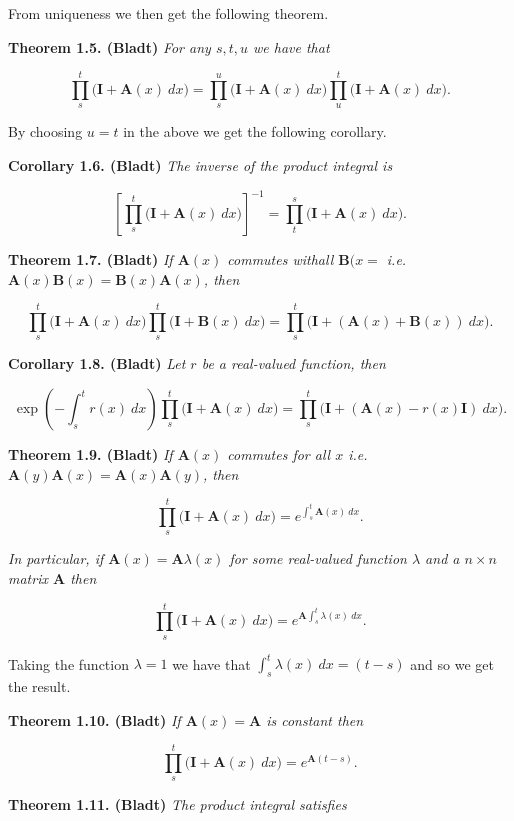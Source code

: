 \documentclass[a4paper,12pt,openany]{book}
\begin{document}
From uniqueness we then get the following theorem.

\textbf{Theorem 1.5. (Bladt)} \emph{For any \(s,t,u\) we have that}

\[
\prod_{s}^t\big(\mathbf{I}+\mathbf{A}(x)\ dx\big)=\prod_{s}^u\big(\mathbf{I}+\mathbf{A}(x)\ dx\big)\prod_{u}^t\big(\mathbf{I}+\mathbf{A}(x)\ dx\big).
\]

By choosing \(u=t\) in the above we get the following corollary.

\textbf{Corollary 1.6. (Bladt)} \emph{The inverse of the product integral is}

\[
\left[\prod_{s}^t\big(\mathbf{I}+\mathbf{A}(x)\ dx\big)\right]^{-1}=\prod_{t}^s\big(\mathbf{I}+\mathbf{A}(x)\ dx\big).
\]

\textbf{Theorem 1.7. (Bladt)} \emph{If \(\mathbf{A}(x)\) commutes withall \(\mathbf{B}(x=\) i.e.~\(\mathbf{A}(x)\mathbf{B}(x)=\mathbf{B}(x)\mathbf{A}(x)\), then}

\[
\prod_{s}^t\big(\mathbf{I}+\mathbf{A}(x)\ dx\big)\prod_{s}^t\big(\mathbf{I}+\mathbf{B}(x)\ dx\big)=\prod_{s}^t\big(\mathbf{I}+\left(\mathbf{A}(x)+\mathbf{B}(x)\right)\ dx\big).
\]

\textbf{Corollary 1.8. (Bladt)} \emph{Let \(r\) be a real-valued function, then}

\[
\exp\left(-\int_s^t r(x)\ dx\right)\prod_{s}^t\big(\mathbf{I}+\mathbf{A}(x)\ dx\big)=\prod_{s}^t\big(\mathbf{I}+\left(\mathbf{A}(x)-r(x)\mathbf{I}\right)\ dx\big).
\]

\textbf{Theorem 1.9. (Bladt)} \emph{If \(\mathbf{A}(x)\) commutes for all \(x\) i.e.~\(\mathbf{A}(y)\mathbf{A}(x)=\mathbf{A}(x)\mathbf{A}(y)\), then}

\[
\prod_{s}^t\big(\mathbf{I}+\mathbf{A}(x)\ dx\big)=e^{\int_s^t\mathbf{A}(x)\ dx}.
\]

\emph{In particular, if \(\mathbf{A}(x)=\mathbf{A}\lambda(x)\) for some real-valued function \(\lambda\) and a \(n\times n\) matrix \(\mathbf{A}\) then}

\[
\prod_{s}^t\big(\mathbf{I}+\mathbf{A}(x)\ dx\big)=e^{\mathbf{A}\int_s^t\lambda(x)\ dx}.
\]

Taking the function \(\lambda=1\) we have that \(\int_s^t\lambda(x)\ dx=(t-s)\) and so we get the result.

\textbf{Theorem 1.10. (Bladt)} \emph{If \(\mathbf{A}(x)=\mathbf{A}\) is constant then}

\[
\prod_{s}^t\big(\mathbf{I}+\mathbf{A}(x)\ dx\big)=e^{\mathbf{A}(t-s)}.
\]

\textbf{Theorem 1.11. (Bladt)} \emph{The product integral satisfies}
\end{document}
